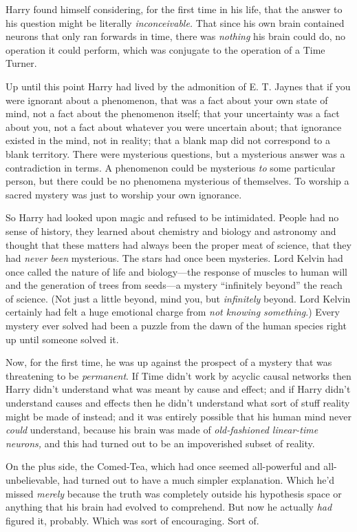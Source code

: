Harry found himself considering, for the first time in his life, that
the answer to his question might be literally \emph{inconceivable.} That
since his own brain contained neurons that only ran forwards in time,
there was \emph{nothing} his brain could do, no operation it could
perform, which was conjugate to the operation of a Time Turner.

Up until this point Harry had lived by the admonition of E. T. Jaynes
that if you were ignorant about a phenomenon, that was a fact about your
own state of mind, not a fact about the phenomenon itself; that your
uncertainty was a fact about you, not a fact about whatever you were
uncertain about; that ignorance existed in the mind, not in reality;
that a blank map did not correspond to a blank territory. There were
mysterious questions, but a mysterious answer was a contradiction in
terms. A phenomenon could be mysterious \emph{to} some particular
person, but there could be no phenomena mysterious of themselves. To
worship a sacred mystery was just to worship your own ignorance.

So Harry had looked upon magic and refused to be intimidated. People had
no sense of history, they learned about chemistry and biology and
astronomy and thought that these matters had always been the proper meat
of science, that they had \emph{never been} mysterious. The stars had
once been mysteries. Lord Kelvin had once called the nature of life and
biology---the response of muscles to human will and the generation of
trees from seeds---a mystery ``infinitely beyond'' the reach of science.
(Not just a little beyond, mind you, but \emph{infinitely} beyond. Lord
Kelvin certainly had felt a huge emotional charge from \emph{not knowing
something}.) Every mystery ever solved had been a puzzle from the dawn
of the human species right up until someone solved it.

Now, for the first time, he was up against the prospect of a mystery
that was threatening to be \emph{permanent}. If Time didn't work by
acyclic causal networks then Harry didn't understand what was meant by
cause and effect; and if Harry didn't understand causes and effects then
he didn't understand what sort of stuff reality might be made of
instead; and it was entirely possible that his human mind never
\emph{could} understand, because his brain was made of
\emph{old-fashioned linear-time neurons,} and this had turned out to be
an impoverished subset of reality.

On the plus side, the Comed-Tea, which had once seemed all-powerful and
all-unbelievable, had turned out to have a much simpler explanation.
Which he'd missed \emph{merely} because the truth was completely outside
his hypothesis space or anything that his brain had evolved to
comprehend. But now he actually \emph{had} figured it, probably. Which
was sort of encouraging. Sort of.

